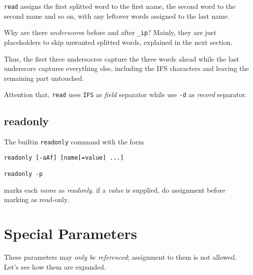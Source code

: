 \lstinline|read| assigns the first splitted word to the first
name, the second word to the second name and so on, with any
leftover words assigned to the last name.

Why are there \textit{underscore}s before and after
\lstinline|_ip|? Mainly, they are just placeholders to skip
unwanted splitted words, explained in the next section.

Thus, the first three undersocres capture the three words
ahead while the last underscore captures everything else, including the
IFS characters and leaving the remaining part untouched.

Attention that, \lstinline|read| uses \verb|IFS| as \textit{field}
separator while use \lstinline|-d| as \textit{record} separator.

\subsection{readonly}
\label{sec:bash-readonly}

The builtin \lstinline|readonly| command with the form

\begin{lstlisting}
readonly [-aAf] [name[=value] ...]

readonly -p
\end{lstlisting}

marks each \textit{name} as \textit{readonly}. if a \textit{value}
is supplied, do assignment before marking as read-only.

\section{Special Parameters}
\label{sec:bash-special-parameters}

These parameters may \textit{only be referenced}; assignment to
them is not allowed. Let's see how them are expanded.

